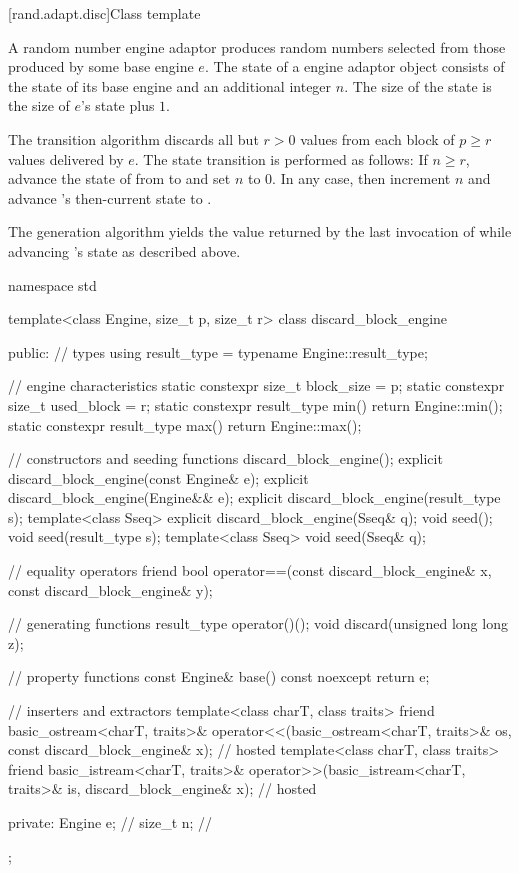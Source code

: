 [rand.adapt.disc]{Class template }%
%

\pnum
A  random number engine adaptor
produces random numbers
selected from those produced by some base engine $e$.
The state 
of a  engine adaptor object 
consists of the state  of its base engine 
and an additional integer $n$.
The size of the state is
 the size of $e$'s state plus $1$.

\pnum
The transition algorithm
discards all but $r > 0$ values
from each block of $p \geq r$ values delivered by $e$.
The state transition is performed as follows:
If $n \geq r$,
 advance the state of  from  to 
 and set $n$ to $0$.
In any case,
 then increment $n$
 and advance 's then-current state 
 to .

\pnum
The generation algorithm
yields the value returned by the last invocation of 
 while advancing 's state as described above.

%
%
\begin{codeblock}
namespace std {
  template<class Engine, size_t p, size_t r>
  class discard_block_engine {
  public:
    // types
    using result_type = typename Engine::result_type;

    // engine characteristics
    static constexpr size_t block_size = p;
    static constexpr size_t used_block = r;
    static constexpr result_type min() { return Engine::min(); }
    static constexpr result_type max() { return Engine::max(); }

    // constructors and seeding functions
    discard_block_engine();
    explicit discard_block_engine(const Engine& e);
    explicit discard_block_engine(Engine&& e);
    explicit discard_block_engine(result_type s);
    template<class Sseq> explicit discard_block_engine(Sseq& q);
    void seed();
    void seed(result_type s);
    template<class Sseq> void seed(Sseq& q);

    // equality operators
    friend bool operator==(const discard_block_engine& x, const discard_block_engine& y);

    // generating functions
    result_type operator()();
    void discard(unsigned long long z);

    // property functions
    const Engine& base() const noexcept { return e; }

    // inserters and extractors
    template<class charT, class traits>
      friend basic_ostream<charT, traits>&
        operator<<(basic_ostream<charT, traits>& os, const discard_block_engine& x);    // hosted
    template<class charT, class traits>
      friend basic_istream<charT, traits>&
        operator>>(basic_istream<charT, traits>& is, discard_block_engine& x);          // hosted

  private:
    Engine e;   // \expos
    size_t n;   // \expos
  };
}
\end{codeblock}

